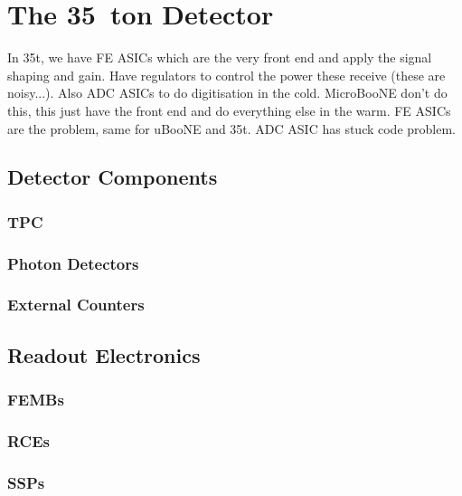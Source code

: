 \section{The 35~ton Detector}\label{sec:35tonDetector}

In 35t, we have FE ASICs which are the very front end and apply the signal shaping and gain.  Have regulators to control the power these receive (these are noisy...).  Also ADC ASICs to do digitisation in the cold.  MicroBooNE don't do this, this just have the front end and do everything else in the warm.  FE ASICs are the problem, same for uBooNE and 35t.  ADC ASIC has stuck code problem.

\subsection{Detector Components}\label{sec:35tonDetectorComponents}

\subsubsection{TPC}\label{35tonTPC}

\subsubsection{Photon Detectors}\label{sec:35tonPhoton}

\subsubsection{External Counters}\label{sec:35tonCounters}

\subsection{Readout Electronics}\label{sec:35tonReadoutElectronics}

\subsubsection{FEMBs}\label{sec:35tonFEMB}

\subsubsection{RCEs}\label{sec:35tonRCE}

\subsubsection{SSPs}\label{sec:35tonSSP}

